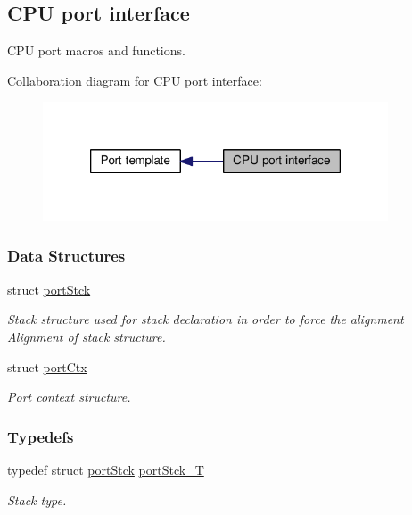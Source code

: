 \hypertarget{group__template__cpu__intf}{\subsection{C\-P\-U port interface}
\label{group__template__cpu__intf}
}


C\-P\-U port macros and functions.  


Collaboration diagram for C\-P\-U port interface\-:\nopagebreak
\begin{figure}[H]
\begin{center}
\leavevmode
\includegraphics[width=290pt]{group__template__cpu__intf}
\end{center}
\end{figure}
\subsubsection*{Data Structures}
\begin{DoxyCompactItemize}
\item 
struct \hyperlink{structportStck}{port\-Stck}
\begin{DoxyCompactList}\small\item\em Stack structure used for stack declaration in order to force the alignment Alignment of stack structure. \end{DoxyCompactList}\item 
struct \hyperlink{structportCtx}{port\-Ctx}
\begin{DoxyCompactList}\small\item\em Port context structure. \end{DoxyCompactList}\end{DoxyCompactItemize}
\subsubsection*{Typedefs}
\begin{DoxyCompactItemize}
\item 
typedef struct \hyperlink{structportStck}{port\-Stck} \hyperlink{group__template__cpu__intf_ga13cc91970e3e05fe4210440c068d3f4a}{port\-Stck\-\_\-\-T}
\begin{DoxyCompactList}\small\item\em Stack type. \end{DoxyCompactList}\end{DoxyCompactItemize}
